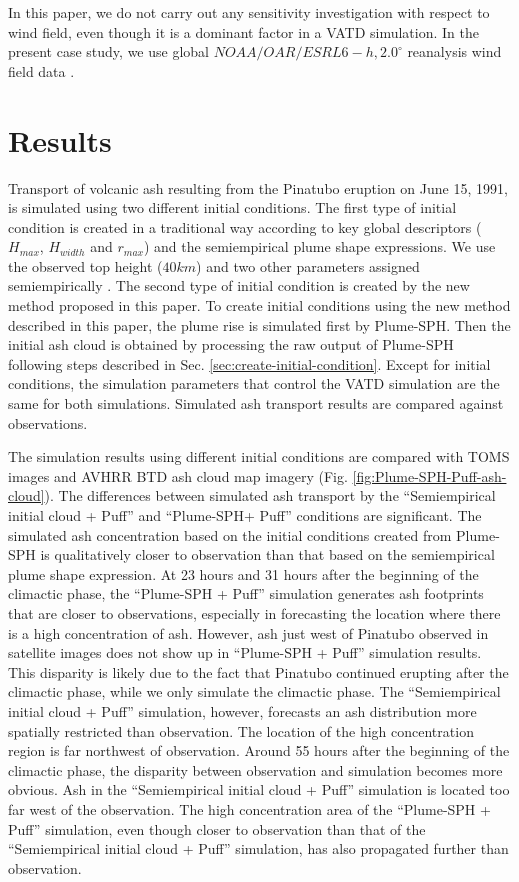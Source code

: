 \documentclass[utf8]{frontiersSCNS} %
\begin{document}
In this paper, we do not carry out any sensitivity investigation with respect to wind field, even though it is a dominant factor in a VATD simulation. In the present case study, we use global $NOAA/OAR/ESRL 6-h, 2.0^{\circ}$ reanalysis wind field data \citep{whitaker2004reanalysis, compo2006feasibility, compo2011twentieth}.

\section{Results}

Transport of volcanic ash resulting from the Pinatubo eruption on June 15, 1991, is simulated using two different initial conditions.
The first type of initial condition is created in a traditional way according to key global descriptors ($H_{max}$, $H_{width}$ and $r_{max}$) and the semiempirical plume shape expressions. We use the observed top height ($40 km$) and two other parameters assigned semiempirically \citep{bursik2012estimation}. The second type of initial condition is created by the new method proposed in this paper. To create initial conditions using the new method described in this paper, the plume rise is simulated first by Plume-SPH. Then the initial ash cloud is obtained by processing the raw output of Plume-SPH following steps described in Sec. \ref{sec:create-initial-condition}. Except for initial conditions, the simulation parameters that control the VATD simulation are the same for both simulations. Simulated ash transport results are compared against observations.

The simulation results using different initial conditions are compared with TOMS images and AVHRR BTD ash cloud map imagery (Fig. \ref{fig:Plume-SPH-Puff-ash-cloud}).  The differences between simulated ash transport by the ``Semiempirical initial cloud + Puff'' and ``Plume-SPH+ Puff'' conditions are significant. The simulated ash concentration based on the initial conditions created from Plume-SPH is qualitatively closer to observation than that based on the semiempirical plume shape expression. At 23 hours and 31 hours after the beginning of the climactic phase, the ``Plume-SPH + Puff'' simulation generates ash footprints that are  closer to observations, especially in forecasting the location where there is a high concentration of ash. However, ash just west of Pinatubo observed in satellite images does not show up in ``Plume-SPH + Puff'' simulation results. This disparity is likely due to the fact that Pinatubo continued erupting after the climactic phase, while we only simulate the climactic phase. The ``Semiempirical initial cloud + Puff'' simulation, however, forecasts an ash distribution more spatially restricted than observation. The location of the high concentration region is far northwest of observation.  Around 55 hours after the beginning of the climactic phase, the disparity between observation and simulation becomes more obvious. Ash in the ``Semiempirical initial cloud + Puff'' simulation is located too far west of the observation. The high concentration area of the ``Plume-SPH + Puff'' simulation, even though closer to observation than that of the ``Semiempirical initial cloud + Puff'' simulation, has also propagated further than observation.
\end{document}
